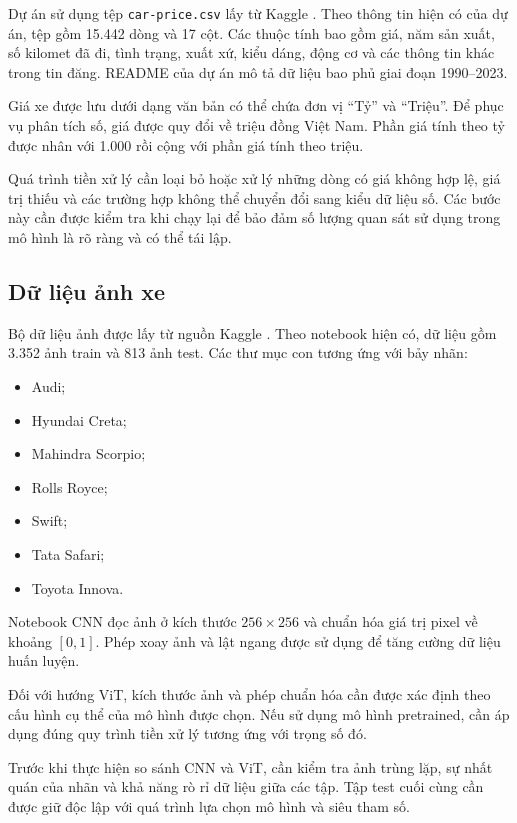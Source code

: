 \documentclass[runningheads]{llncs}
\begin{document}
Dự án sử dụng tệp \texttt{car-price.csv} lấy từ Kaggle
\cite{carprice}. Theo thông tin hiện có của dự án, tệp
gồm 15.442 dòng và 17 cột. Các thuộc tính bao gồm giá,
năm sản xuất, số kilomet đã đi, tình trạng, xuất xứ, kiểu
dáng, động cơ và các thông tin khác trong tin đăng. README
của dự án mô tả dữ liệu bao phủ giai đoạn 1990--2023.

Giá xe được lưu dưới dạng văn bản có thể chứa đơn vị
``Tỷ'' và ``Triệu''. Để phục vụ phân tích số, giá được
quy đổi về triệu đồng Việt Nam. Phần giá tính theo tỷ
được nhân với 1.000 rồi cộng với phần giá tính theo triệu.

Quá trình tiền xử lý cần loại bỏ hoặc xử lý những dòng có
giá không hợp lệ, giá trị thiếu và các trường hợp không
thể chuyển đổi sang kiểu dữ liệu số. Các bước này cần được
kiểm tra khi chạy lại để bảo đảm số lượng quan sát sử dụng
trong mô hình là rõ ràng và có thể tái lập.

\subsection{Dữ liệu ảnh xe}

Bộ dữ liệu ảnh được lấy từ nguồn Kaggle
\cite{carimages}. Theo notebook hiện có, dữ liệu gồm
3.352 ảnh train và 813 ảnh test. Các thư mục con tương
ứng với bảy nhãn:

\begin{itemize}
    \item Audi;
    \item Hyundai Creta;
    \item Mahindra Scorpio;
    \item Rolls Royce;
    \item Swift;
    \item Tata Safari;
    \item Toyota Innova.
\end{itemize}

Notebook CNN đọc ảnh ở kích thước $256 \times 256$ và
chuẩn hóa giá trị pixel về khoảng $[0,1]$. Phép xoay ảnh
và lật ngang được sử dụng để tăng cường dữ liệu huấn luyện.

Đối với hướng ViT, kích thước ảnh và phép chuẩn hóa cần
được xác định theo cấu hình cụ thể của mô hình được chọn.
Nếu sử dụng mô hình pretrained, cần áp dụng đúng quy trình
tiền xử lý tương ứng với trọng số đó.

Trước khi thực hiện so sánh CNN và ViT, cần kiểm tra ảnh
trùng lặp, sự nhất quán của nhãn và khả năng rò rỉ dữ liệu
giữa các tập. Tập test cuối cùng cần được giữ độc lập với
quá trình lựa chọn mô hình và siêu tham số.
\end{document}

